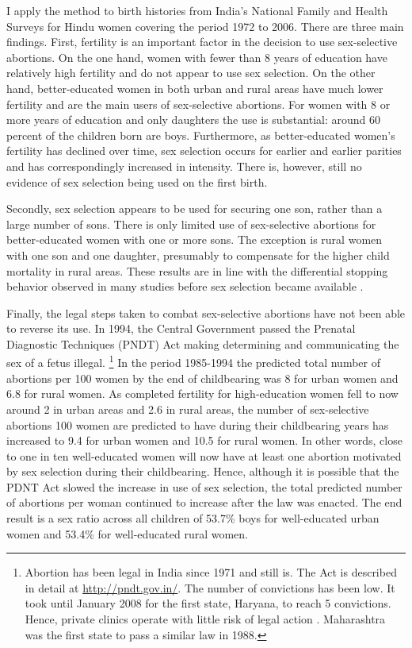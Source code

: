 \documentclass[12pt,letterpaper]{article}
\begin{document}
I apply the method to birth histories from India's National Family and Health Surveys 
for Hindu women covering the period 1972 to 2006. 
There are three main findings.
First, fertility is an important factor in the decision to use sex-selective 
abortions.
On the one hand, women with fewer than 8 years of education have relatively high fertility 
and do not appear to use sex selection.
On the other hand, better-educated women in both urban and rural areas have much lower
fertility and are the main users of sex-selective abortions.
For women with 8 or more years of education and only daughters the 
use is substantial: around 60 percent of the children born are boys.
Furthermore, as better-educated women's fertility has declined over time, sex selection 
occurs for earlier and earlier parities and has correspondingly increased in intensity.
There is, however, still no evidence of sex selection being used on the first birth.

Secondly, sex selection appears to be used for securing one son, rather than a large 
number of sons.
There is only limited use of sex-selective abortions for better-educated
women with one or more sons.
The exception is rural women with one son and one daughter, presumably to compensate for 
the higher child mortality in rural areas.
These results are in line with the differential stopping behavior observed in many studies
before sex selection became available \citep{repetto72,arnold98,dreze01}.

Finally, 
the legal steps taken to combat sex-selective abortions have not been able 
to reverse its use.
In 1994, the Central Government passed the Prenatal Diagnostic Techniques (PNDT) Act 
making determining and communicating the sex of a fetus illegal.%
\footnote{
Abortion has been legal in India since 1971 and still is.
The Act is described in detail at \href{http://pndt.gov.in/}{http://pndt.gov.in/}.
The number of convictions has been low.
It took until January 2008 for the first state, Haryana, to reach 5 convictions.
Hence, private clinics operate with little risk of legal action \citep{Sudha1999}.
Maharashtra was the first state to pass a similar law in 1988.
}
In the period 1985-1994 the predicted total number of abortions per 100 women by the 
end of childbearing was 8 for urban women and 6.8 for rural women.
As completed fertility for high-education women fell to now 
around 2 in urban areas and 2.6 in rural areas, 
the number of sex-selective abortions 100 women are predicted to have 
during their childbearing years has increased to 9.4 for urban women and 
10.5 for rural women.
In other words, close to one in ten well-educated women will now have at least 
one abortion motivated by sex selection during their childbearing.
Hence, although it is possible that the PDNT Act slowed the increase in use 
of sex selection, the total predicted number of abortions per woman continued 
to increase after the law was enacted.
The end result is a sex ratio across all children of 53.7\% boys for well-educated 
urban women and 53.4\% for well-educated rural women.
\end{document}
